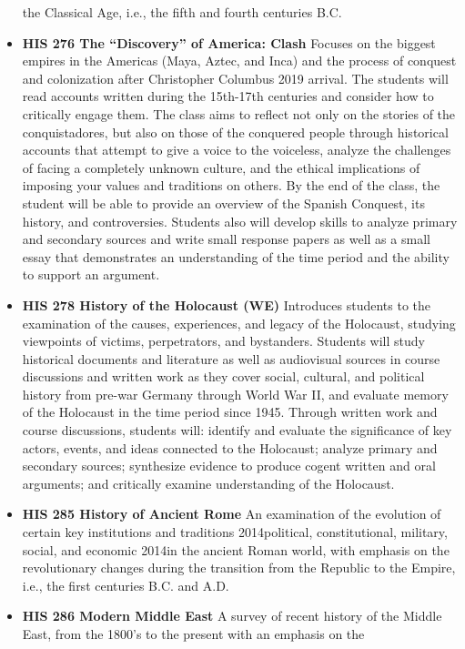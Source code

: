 \documentclass[
  letterpaper,
]{scrbook}
\begin{document}
\begin{itemize}
  the Classical Age, i.e., the fifth and fourth centuries B.C.
\item
  \textbf{HIS 276 The ``Discovery'' of America: Clash} Focuses on the
  biggest empires in the Americas (Maya, Aztec, and Inca) and the
  process of conquest and colonization after Christopher Columbus 2019
  arrival. The students will read accounts written during the 15th-17th
  centuries and consider how to critically engage them. The class aims
  to reflect not only on the stories of the conquistadores, but also on
  those of the conquered people through historical accounts that attempt
  to give a voice to the voiceless, analyze the challenges of facing a
  completely unknown culture, and the ethical implications of imposing
  your values and traditions on others. By the end of the class, the
  student will be able to provide an overview of the Spanish Conquest,
  its history, and controversies. Students also will develop skills to
  analyze primary and secondary sources and write small response papers
  as well as a small essay that demonstrates an understanding of the
  time period and the ability to support an argument.
\item
  \textbf{HIS 278 History of the Holocaust (WE)} Introduces students to
  the examination of the causes, experiences, and legacy of the
  Holocaust, studying viewpoints of victims, perpetrators, and
  bystanders. Students will study historical documents and literature as
  well as audiovisual sources in course discussions and written work as
  they cover social, cultural, and political history from pre-war
  Germany through World War II, and evaluate memory of the Holocaust in
  the time period since 1945. Through written work and course
  discussions, students will: identify and evaluate the significance of
  key actors, events, and ideas connected to the Holocaust; analyze
  primary and secondary sources; synthesize evidence to produce cogent
  written and oral arguments; and critically examine understanding of
  the Holocaust.
\item
  \textbf{HIS 285 History of Ancient Rome} An examination of the
  evolution of certain key institutions and traditions 2014political,
  constitutional, military, social, and economic 2014in the ancient
  Roman world, with emphasis on the revolutionary changes during the
  transition from the Republic to the Empire, i.e., the first centuries
  B.C. and A.D.
\item
  \textbf{HIS 286 Modern Middle East} A survey of recent history of the
  Middle East, from the 1800's to the present with an emphasis on the

\end{itemize}
\end{document}
